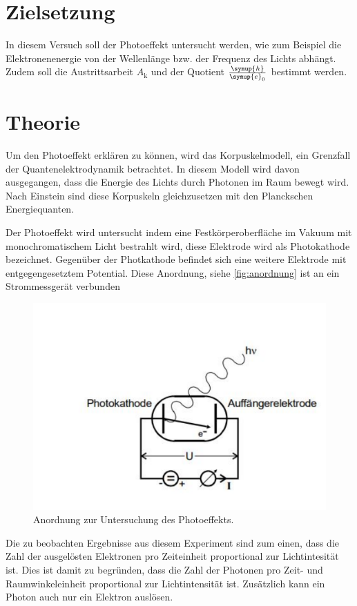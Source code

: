\section{Zielsetzung}
In diesem Versuch soll der Photoeffekt untersucht werden, wie zum Beispiel die Elektronenenergie von der Wellenlänge bzw. der Frequenz des Lichts abhängt.
Zudem soll die Austrittsarbeit $A_\text{k}$ und der Quotient $\frac{\symup{h}}{\symup{e}_0}$ bestimmt werden.

\section{Theorie}
\label{sec:Theorie}
Um den Photoeffekt erklären zu können, wird das Korpuskelmodell, ein Grenzfall der Quantenelektrodynamik betrachtet.
In diesem Modell wird davon ausgegangen, dass die Energie des Lichts durch Photonen im Raum bewegt wird.
Nach Einstein sind diese Korpuskeln gleichzusetzen mit den Planckschen Energiequanten.

\noindent
Der Photoeffekt wird untersucht indem eine Festkörperoberfläche im Vakuum mit monochromatischem Licht bestrahlt wird, diese Elektrode wird als Photokathode bezeichnet.
Gegenüber der Photkathode befindet sich eine weitere Elektrode mit entgegengesetztem Potential.
Diese Anordnung, siehe \autoref{fig:anordnung} ist an ein Strommessgerät verbunden

\begin{figure}
    \centering
    \includegraphics[width =\textwidth]{content/anordnung.pdf}
    \caption{Anordnung zur Untersuchung des Photoeffekts.\cite{anleitung}}
    \label{fig:anordnung}
\end{figure}
\noindent
Die zu beobachten Ergebnisse aus diesem Experiment sind zum einen, dass die Zahl der ausgelösten Elektronen pro Zeiteinheit proportional zur Lichtintesität ist.
Dies ist damit zu begründen, dass die Zahl der Photonen pro Zeit- und Raumwinkeleinheit proportional zur Lichtintensität ist.
Zusätzlich kann ein Photon auch nur ein Elektron auslösen.

